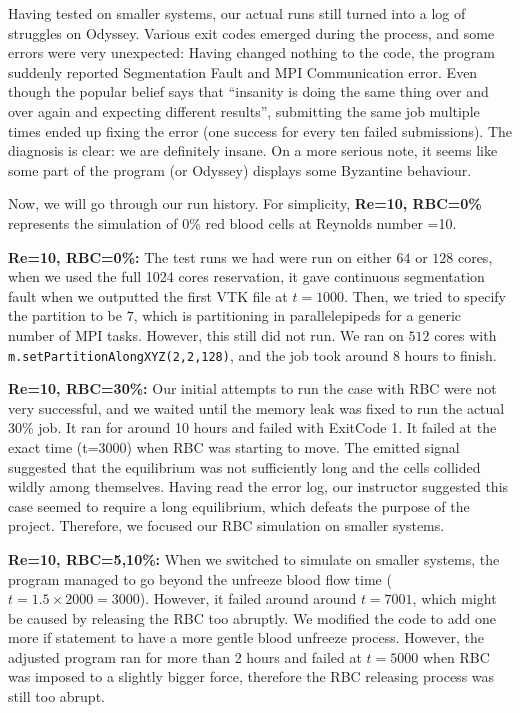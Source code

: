 \documentclass[11pt]{article} %
\begin{document}
    
Having tested on smaller systems, our actual runs still turned into a log of struggles on Odyssey. Various exit codes emerged during the process, and some errors were very unexpected: Having changed nothing to the code, the program suddenly reported Segmentation Fault and MPI Communication error. Even though the popular belief says that ``insanity is doing the same thing over and over again and expecting different results'', submitting the same job multiple times ended up fixing the error (one success for every ten failed submissions). The diagnosis is clear: we are definitely insane. On a more serious note, it seems like some part of the program (or Odyssey) displays some Byzantine behaviour.

Now, we will go through our run history. For simplicity, \textbf{Re=10, RBC=0\%} represents the simulation of 0\% red blood cells at Reynolds number =10.

\textbf{Re=10, RBC=0\%:}
The test runs we had were run on either $64$ or $128$ cores, when we used the full 1024 cores reservation, it gave continuous segmentation fault when we outputted the first VTK file at $t=1000$. Then, we tried to specify the partition to be $7$, which is partitioning in parallelepipeds for a generic number of MPI tasks. However, this still did not run. We ran on $512$ cores with \texttt{m.setPartitionAlongXYZ(2,2,128)}, and the job took around 8 hours to finish.

\textbf{Re=10, RBC=30\%:}
Our initial attempts to run the case with RBC were not very successful, and we waited until the memory leak was fixed to run the actual 30\% job. It ran for around 10 hours and failed with ExitCode 1. It failed at the exact time (t=3000) when RBC was starting to move. The emitted signal suggested that the equilibrium was not sufficiently long and the cells collided wildly among themselves. Having read the error log, our instructor suggested this case seemed to require a long equilibrium, which defeats the purpose of the project. Therefore, we focused our RBC simulation on smaller systems.

\textbf{Re=10, RBC=5,10\%:}
When we switched to simulate on smaller systems, the program managed to go beyond the unfreeze blood flow time ($t=1.5\times2000=3000$). However, it failed around around $t=7001$, which might be caused by releasing the RBC too abruptly. We modified the code to add one more if statement to have a more gentle blood unfreeze process. However, the adjusted program ran for more than 2 hours and failed at $t=5000$ when RBC was imposed to a slightly bigger force, therefore the RBC releasing process was still too abrupt.
\end{document}
